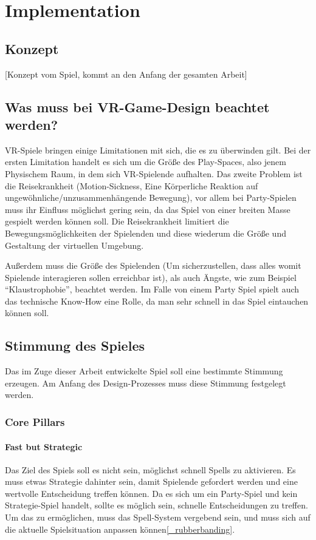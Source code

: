 \chapter{Implementation}

\section{Konzept}

[Konzept vom Spiel, kommt an den Anfang der gesamten Arbeit]

\section{Was muss bei VR-Game-Design beachtet werden?}

VR-Spiele bringen einige Limitationen mit sich, die es zu überwinden gilt. Bei der ersten Limitation handelt es sich um die Größe des Play-Spaces, also jenem Physischem Raum, in dem sich VR-Spielende aufhalten. Das zweite Problem ist die Reisekrankheit (Motion-Sickness, Eine Körperliche Reaktion auf ungewöhnliche/unzusammenhängende Bewegung\cite[S. 533]{_art_of_gamedesign}), vor allem bei Party-Spielen muss ihr Einfluss möglichst gering sein, da das Spiel von einer breiten Masse gespielt werden können soll. Die Reisekrankheit limitiert die Bewegungsmöglichkeiten der Spielenden und diese wiederum die Größe und Gestaltung der virtuellen Umgebung.

Außerdem muss die Größe des Spielenden (Um sicherzustellen, dass alles womit Spielende interagieren sollen erreichbar ist), als auch Ängste, wie zum Beispiel "`Klaustrophobie"', beachtet werden. Im Falle von einem Party Spiel spielt auch das technische Know-How eine Rolle, da man sehr schnell in das Spiel eintauchen können soll.

\section{Stimmung des Spieles}
Das im Zuge dieser Arbeit entwickelte Spiel soll eine bestimmte Stimmung erzeugen. Am Anfang des Design-Prozesses muss diese Stimmung festgelegt werden.

\subsection{Core Pillars}

\subsubsection{Fast but Strategic}
Das Ziel des Spiels soll es nicht sein, möglichst schnell Spells zu aktivieren. Es muss etwas Strategie dahinter sein, damit Spielende gefordert werden und eine wertvolle Entscheidung treffen können. Da es sich um ein Party-Spiel und kein Strategie-Spiel handelt, sollte es möglich sein, schnelle Entscheidungen zu treffen. Um das zu ermöglichen, muss das Spell-System vergebend sein, und muss sich auf die aktuelle Spielsituation anpassen können\ref{_rubberbanding}. 

